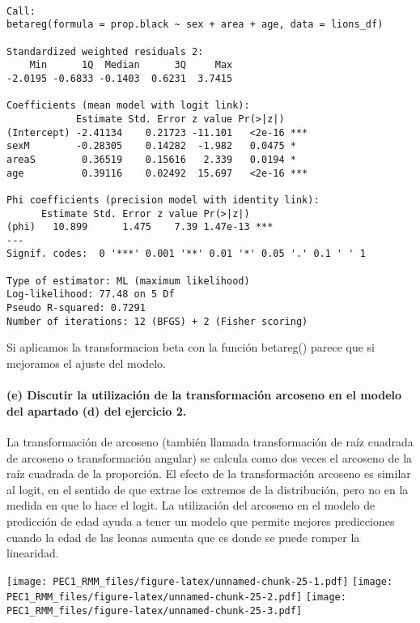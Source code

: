 \documentclass[
]{article}
\begin{document}
\begin{verbatim}

Call:
betareg(formula = prop.black ~ sex + area + age, data = lions_df)

Standardized weighted residuals 2:
    Min      1Q  Median      3Q     Max 
-2.0195 -0.6833 -0.1403  0.6231  3.7415 

Coefficients (mean model with logit link):
            Estimate Std. Error z value Pr(>|z|)    
(Intercept) -2.41134    0.21723 -11.101   <2e-16 ***
sexM        -0.28305    0.14282  -1.982   0.0475 *  
areaS        0.36519    0.15616   2.339   0.0194 *  
age          0.39116    0.02492  15.697   <2e-16 ***

Phi coefficients (precision model with identity link):
      Estimate Std. Error z value Pr(>|z|)    
(phi)   10.899      1.475    7.39 1.47e-13 ***
---
Signif. codes:  0 '***' 0.001 '**' 0.01 '*' 0.05 '.' 0.1 ' ' 1 

Type of estimator: ML (maximum likelihood)
Log-likelihood: 77.48 on 5 Df
Pseudo R-squared: 0.7291
Number of iterations: 12 (BFGS) + 2 (Fisher scoring) 
\end{verbatim}

Si aplicamos la transformacion beta con la función betareg() parece que
si mejoramos el ajuste del modelo.

\hypertarget{e-discutir-la-utilizaciuxf3n-de-la-transformaciuxf3n-arcoseno-en-el-modelo-del-apartado-d-del-ejercicio-2.}{%
\paragraph{\texorpdfstring{\textbf{(e) Discutir la utilización de la
transformación arcoseno en el modelo del apartado (d) del ejercicio
2.}}{(e) Discutir la utilización de la transformación arcoseno en el modelo del apartado (d) del ejercicio 2.}}\label{e-discutir-la-utilizaciuxf3n-de-la-transformaciuxf3n-arcoseno-en-el-modelo-del-apartado-d-del-ejercicio-2.}}

La transformación de arcoseno (también llamada transformación de raíz
cuadrada de arcoseno o transformación angular) se calcula como dos veces
el arcoseno de la raíz cuadrada de la proporción. El efecto de la
transformación arcoseno es similar al logit, en el sentido de que extrae
los extremos de la distribución, pero no en la medida en que lo hace el
logit. La utilización del arcoseno en el modelo de predicción de edad
ayuda a tener un modelo que permite mejores predicciones cuando la edad
de las leonas aumenta que es donde se puede romper la linearidad.

\texttt{[image: PEC1\_RMM\_files/figure-latex/unnamed-chunk-25-1.pdf]}
\texttt{[image: PEC1\_RMM\_files/figure-latex/unnamed-chunk-25-2.pdf]}
\texttt{[image: PEC1\_RMM\_files/figure-latex/unnamed-chunk-25-3.pdf]}
\end{document}
